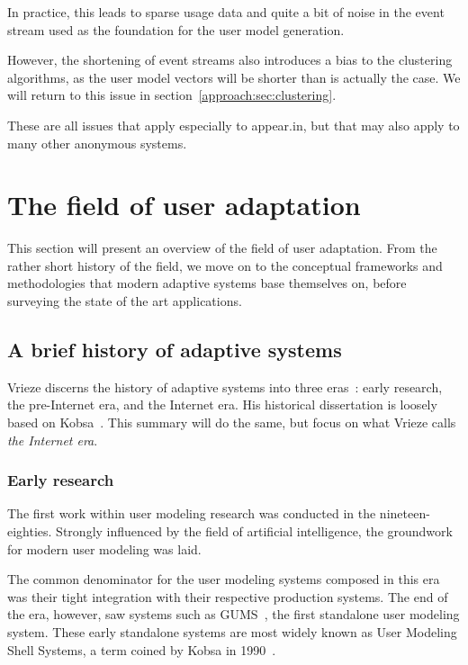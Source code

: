 In practice, this leads to sparse usage data and quite a bit of noise in the event stream used as the foundation for the user model generation.

However, the shortening of event streams also introduces a bias to the clustering algorithms, as the user model vectors will be shorter than is actually the case. We will return to this issue in section~\ref{approach:sec:clustering}.

These are all issues that apply especially to appear.in, but that may also apply to many other anonymous systems.

\section{The field of user adaptation}
\label{survey:sec:user_adaptation}

This section will present an overview of the field of user adaptation. From the rather short history of the field, we move on to the conceptual frameworks and methodologies that modern adaptive systems base themselves on, before surveying the state of the art applications.

\subsection{A brief history of adaptive systems}
\label{survey:sec:adaptive_systems_history}

Vrieze discerns the history of adaptive systems into three eras~\cite{Vrieze}: early research, the pre-Internet era, and the Internet era. His historical dissertation is loosely based on Kobsa~\cite{Kobsa2001}. This summary will do the same, but focus on what Vrieze calls \emph{the Internet era}.

\subsubsection{Early research}

The first work within user modeling research was conducted in the nineteen-eighties. Strongly influenced by the field of artificial intelligence, the groundwork for modern user modeling was laid.

The common denominator for the user modeling systems composed in this era was their tight integration with their respective production systems. The end of the era, however, saw systems such as GUMS~\cite{Finin1989}, the first standalone user modeling system. These early standalone systems are most widely known as User Modeling Shell Systems, a term coined by Kobsa in 1990~\cite{Kobsa1990}.

